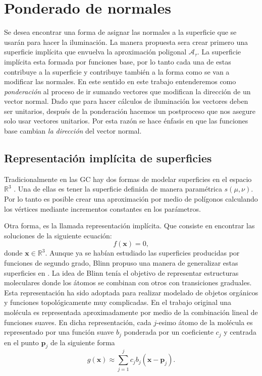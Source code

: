 \chapter{Ponderado de normales}
\label{chap:ponderadoNormales}
Se desea encontrar una forma de asignar las normales a la superficie que se usarán para hacer la iluminación. La manera propuesta sera crear primero una superficie implícita que envuelva la aproximación poligonal $\mathcal{A}_{\tau}$. La superficie implícita esta formada por funciones base, por lo tanto cada una de estas contribuye a la superficie y contribuye también a la forma como se van a modificar las normales. En este sentido en este trabajo entenderemos como \emph{ponderación} al proceso de ir sumando vectores que modifican la dirección de un vector normal. Dado que para hacer cálculos de iluminación los vectores deben ser unitarios, después de la ponderación hacemos un postproceso que nos asegure solo usar vectores unitarios. Por esta razón se hace énfasis en que las funciones base cambian \emph{la dirección} del vector normal.

\section{Representación implícita de superficies}
\label{sec:repImplicita}
Tradicionalmente en las GC hay dos formas de modelar superficies en el espacio $\mathbb{R}^3$ \cite{Blinn:metaballs}. Una de ellas es tener la superficie definida de manera paramétrica $s(\mu,\nu)$. Por lo tanto es posible crear una aproximación por medio de polígonos calculando los vértices mediante incrementos constantes en los parámetros.

Otra forma, es la llamada representación implícita. Que consiste en encontrar las soluciones de la siguiente ecuación:
\begin{equation}
 f(\textbf{x}) = 0,
\label{ec:supImplicita}
\end{equation}
donde $\textbf{x} \in \mathbb{R}^3$. Aunque ya se habían estudiado las superficies producidas por funciones de segundo grado, Blinn propuso una manera de generalizar estas superficies en \cite{Blinn:metaballs}. La idea de Blinn tenía el objetivo de representar estructuras moleculares donde los átomos se combinan con otros con transiciones graduales. Esta representación ha sido adoptada para realizar modelado de objetos orgánicos y funciones topológicamente muy complicadas. En el trabajo original una molécula es representada aproximadamente por medio de la combinación lineal de funciones suaves. En dicha representación, cada $j$-esimo átomo de la molécula es representado por una función suave $b_j$ ponderada por un coeficiente $c_j$ y centrada en el punto $\textbf{p}_j$ de la siguiente forma
\begin{equation}
 g(\textbf{x}) \approx \sum \limits_{j = 1}^{j} c_j b_j(\textbf{x} - \textbf{p}_j).
\label{ec:modeloBlobby}
\end{equation}

